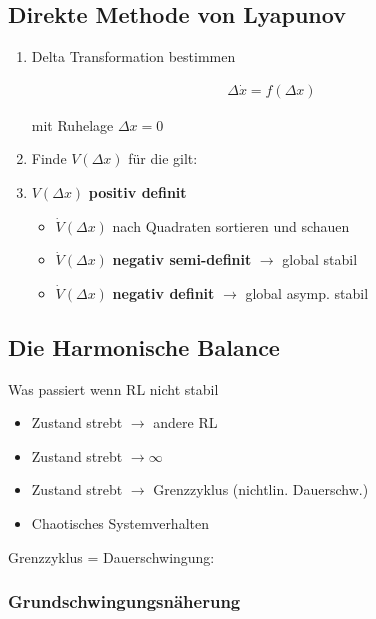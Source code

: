 \documentclass[10pt,a4paper]{article}
\begin{document}
  \subsection{Direkte Methode von Lyapunov}
  \begin{enumerate}
    \item Delta Transformation bestimmen
  \begin{mdframed}[style=exercise]
    \begin{align}
        \Delta \dot{x} = f (\Delta x)
    \end{align}
  \end{mdframed}
  mit Ruhelage $\Delta x = 0$
    \item Finde $V(\Delta x)$ für die gilt:
    \item $V(\Delta x)$ \textbf{positiv definit}
        \begin{itemize}
            \item $\dot{V}(\Delta x)$ nach Quadraten sortieren und schauen
            \item $\dot{V}(\Delta x)$ \textbf{negativ semi-definit} $\rightarrow$ global stabil 
            \item $\dot{V}(\Delta x)$ \textbf{negativ definit} $\rightarrow$ global asymp. stabil 
        \end{itemize}
  \end{enumerate}

  \newpage
  \subsection{Die Harmonische Balance}
  Was passiert wenn RL nicht stabil
  \begin{itemize}
    \item Zustand strebt $\rightarrow$ andere RL
    \item Zustand strebt $\rightarrow \infty$
    \item Zustand strebt $\rightarrow$ Grenzzyklus (nichtlin. Dauerschw.)
    \item Chaotisches Systemverhalten
  \end{itemize}
  Grenzzyklus = Dauerschwingung:

  \subsubsection{Grundschwingungsnäherung}
\end{document}
